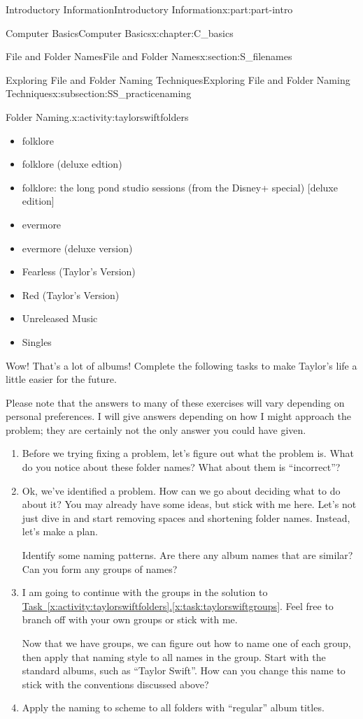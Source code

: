 \documentclass[oneside,10pt,]{book}
\newcommand{\xreffont}{\relax}
\begin{document}
\begin{partptx}{Introductory Information}{}{Introductory Information}{}{}{x:part:part-intro}
\begin{chapterptx}{Computer Basics}{}{Computer Basics}{}{}{x:chapter:C_basics}
\begin{sectionptx}{File and Folder Names}{}{File and Folder Names}{}{}{x:section:S_filenames}
\begin{subsectionptx}{Exploring File and Folder Naming Techniques}{}{Exploring File and Folder Naming Techniques}{}{}{x:subsection:SS_practicenaming}
\begin{activity}{Folder Naming.}{x:activity:taylorswiftfolders}
\begin{multicols}{2}
\begin{itemize}[label=\textbullet]
\item{}folklore%
\item{}folklore (deluxe edtion)%
\item{}folklore: the long pond studio sessions (from the Disney+ special) [deluxe edition]%
\item{}evermore%
\item{}evermore (deluxe version)%
\item{}Fearless (Taylor's Version)%
\item{}Red (Taylor's Version)%
\item{}Unreleased Music%
\item{}Singles%
\end{itemize}
\end{multicols}
%
\par
Wow! That's a lot of albums! Complete the following tasks to make Taylor's life a little easier for the future.%
\par
Please note that the answers to many of these exercises will vary depending on personal preferences. I will give answers depending on how I might approach the problem; they are certainly not the only answer you could have given.%
\begin{enumerate}[font=\bfseries,label=(\alph*),ref=\alph*]
\item{}Before we trying fixing a problem, let's figure out what the problem is. What do you notice about these folder names? What about them is ``incorrect''?%
\item\label{x:task:taylorswiftgroups}Ok, we've identified a problem. How can we go about deciding what to do about it? You may already have some ideas, but stick with me here. Let's not just dive in and start removing spaces and shortening folder names. Instead, let's make a plan.%
\par
Identify some naming patterns. Are there any album names that are similar? Can you form any groups of names?%
\item{}I am going to continue with the groups in the solution to \hyperref[x:task:taylorswiftgroups]{Task~{\xreffont\ref{x:activity:taylorswiftfolders}}.{\xreffont\ref{x:task:taylorswiftgroups}}}. Feel free to branch off with your own groups or stick with me.%
\par
Now that we have groups, we can figure out how to name one of each group, then apply that naming style to all names in the group. Start with the standard albums, such as ``Taylor Swift''. How can you change this name to stick with the conventions discussed above?%
\item{}Apply the naming to scheme to all folders with ``regular'' album titles.%

\end{enumerate}
\end{activity}
\end{subsectionptx}
\end{sectionptx}
\end{chapterptx}
\end{partptx}
\end{document}
